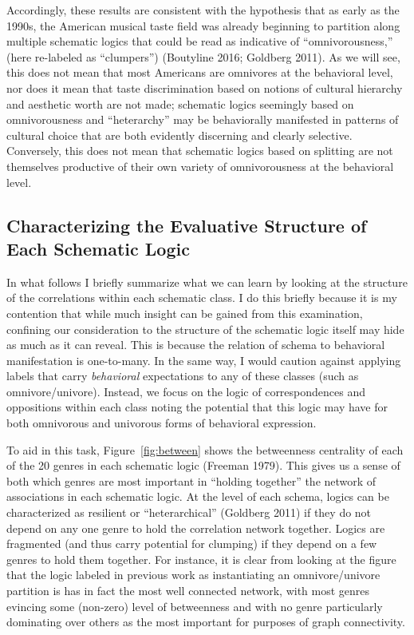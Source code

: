 \documentclass[preprint,12pt]{elsarticle}
\begin{document}
Accordingly, these results are consistent with the hypothesis that as early as the 1990s, the American musical taste field was already beginning to partition along multiple schematic logics that could be read as indicative of ``omnivorousness,'' (here re-labeled as ``clumpers'') (Boutyline 2016; Goldberg 2011). As we will see, this does not mean that most Americans are omnivores at the behavioral level, nor does it mean that taste discrimination based on notions of cultural hierarchy and aesthetic worth are not made; schematic logics seemingly based on omnivorousness and ``heterarchy'' may be behaviorally manifested in patterns of cultural choice that are both evidently discerning and clearly selective. Conversely, this does not mean that schematic logics based on splitting are not themselves productive of their own variety of omnivorousness at the behavioral level. 

\subsection{Characterizing the Evaluative Structure of Each Schematic Logic}
In what follows I briefly summarize what we can learn by looking at the structure of the correlations within each schematic class. I do this briefly because it is my contention that while much insight can be gained from this examination, confining our consideration to the structure of the schematic logic itself may hide as much as it can reveal. This is because the relation of schema to behavioral manifestation is one-to-many. In the same way, I would caution against applying labels that carry \emph{behavioral} expectations to any of these classes (such as omnivore/univore). Instead, we focus on the logic of correspondences and oppositions within each class noting the potential that this logic may have for both omnivorous and univorous forms of behavioral expression. 

To aid in this task, Figure~\ref{fig:between} shows the betweenness centrality of each of the 20 genres in each schematic logic (Freeman 1979). This gives us a sense of both which genres are most important in ``holding together'' the network of associations in each schematic logic. At the level of each schema, logics can be characterized as resilient or ``heterarchical'' (Goldberg 2011) if they do not depend on any one genre to hold the correlation network together. Logics are fragmented (and thus carry potential for clumping) if they depend on a few genres to hold them together. For instance, it is clear from looking at the figure that the logic labeled in previous work as instantiating an omnivore/univore partition is has in fact the most well connected network, with most genres evincing some (non-zero) level of betweenness and with no genre particularly dominating over others as the most important for purposes of graph connectivity. 
\end{document}
